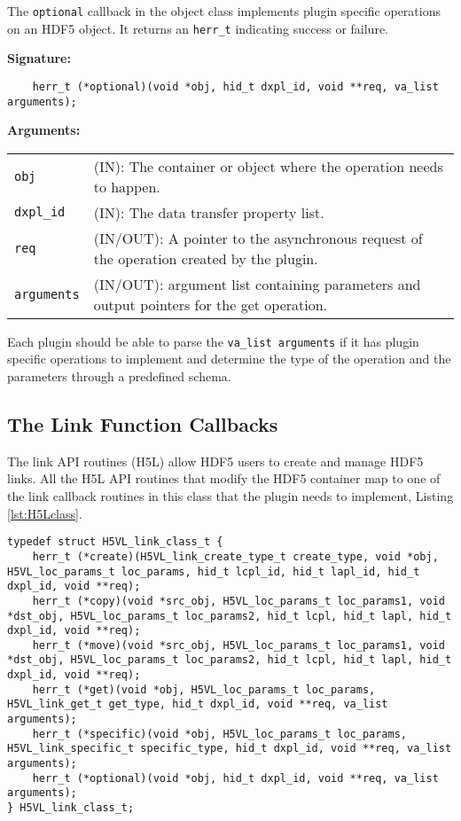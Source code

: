 The \texttt{optional} callback in the object class implements plugin specific operations on an HDF5 object. It returns an \texttt{herr\_t} indicating success or failure. \bigskip

\begin{mdframed}[style=bgbox]
\textbf{Signature:}
\begin{lstlisting}
    herr_t (*optional)(void *obj, hid_t dxpl_id, void **req, va_list arguments);
\end{lstlisting}

\textbf{Arguments:}\\
\begin{tabular}{l p{10cm}}
  \texttt{obj} & (IN): The container or object where the operation needs to happen.\\
  \texttt{dxpl\_id} & (IN): The data transfer property list.\\
  \texttt{req} & (IN/OUT): A pointer to the asynchronous request of the operation created by the plugin.\\
  \texttt{arguments} & (IN/OUT): argument list containing parameters and output pointers for the get operation. \\
\end{tabular}
\end{mdframed}

Each plugin should be able to parse the \texttt{va\_list arguments} if it has plugin specific operations to implement and determine the type of the operation and the parameters through a predefined schema. 

\subsection{The Link Function Callbacks}
The link API routines (H5L) allow HDF5 users to create and manage
HDF5 links. All the H5L API routines that modify the HDF5 container
map to one of the link callback routines in this class that the
plugin needs to implement, Listing \ref{lst:H5Lclass}.

\begin{lstlisting}[caption={Structure for link callback routines, H5VLpublic.h}, captionpos=b, label={lst:H5Lclass}]
typedef struct H5VL_link_class_t {
    herr_t (*create)(H5VL_link_create_type_t create_type, void *obj, H5VL_loc_params_t loc_params, hid_t lcpl_id, hid_t lapl_id, hid_t dxpl_id, void **req);
    herr_t (*copy)(void *src_obj, H5VL_loc_params_t loc_params1, void *dst_obj, H5VL_loc_params_t loc_params2, hid_t lcpl, hid_t lapl, hid_t dxpl_id, void **req);
    herr_t (*move)(void *src_obj, H5VL_loc_params_t loc_params1, void *dst_obj, H5VL_loc_params_t loc_params2, hid_t lcpl, hid_t lapl, hid_t dxpl_id, void **req);
    herr_t (*get)(void *obj, H5VL_loc_params_t loc_params, H5VL_link_get_t get_type, hid_t dxpl_id, void **req, va_list arguments);
    herr_t (*specific)(void *obj, H5VL_loc_params_t loc_params, H5VL_link_specific_t specific_type, hid_t dxpl_id, void **req, va_list arguments);
    herr_t (*optional)(void *obj, hid_t dxpl_id, void **req, va_list arguments);
} H5VL_link_class_t;
\end{lstlisting}


